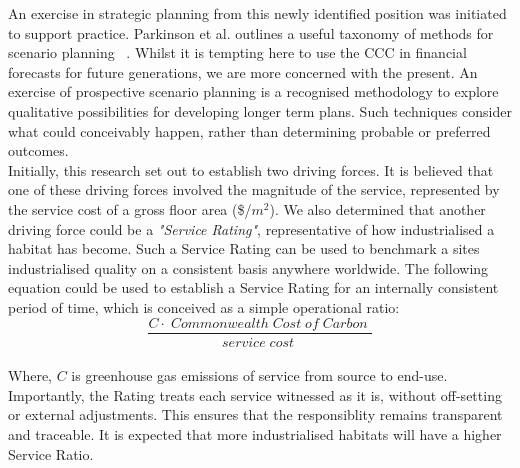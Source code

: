 \documentclass[10pt, oneside]{article}   	%
\begin{document}
An exercise in strategic planning from this newly identified position was initiated to support practice.
Parkinson et al. outlines a useful taxonomy of methods for scenario planning ~\cite{atp1}.
Whilst it is tempting here to use the CCC in financial forecasts for future generations, we are more concerned with the present.
An exercise of prospective scenario planning is a recognised methodology to explore qualitative possibilities for developing longer term plans.
Such techniques consider what could conceivably happen, rather than determining probable or preferred outcomes.\\

Initially, this research set out to establish two driving forces.
It is believed that one of these driving forces involved the magnitude of the service, represented by the service cost of a gross floor area (\$/$m^2$).
We also determined that another driving force could be a \emph{"Service Rating"}, representative of how industrialised a habitat has become.
Such a Service Rating can be used to benchmark a sites industrialised quality on a consistent basis anywhere worldwide.
The following equation could be used to establish a Service Rating for an internally consistent period of time, which is conceived as a simple operational ratio:\\

\begin{equation}
	\frac{C  \cdot \;Commonwealth\; Cost\; of\; Carbon\;}{service\; cost\;}
\end{equation}\\

Where, $C$ is greenhouse gas emissions of service from source to end-use.
Importantly, the Rating treats each service witnessed as it is, without off-setting or external adjustments.
This ensures that the responsiblity remains transparent and traceable.
It is expected that more industrialised habitats will have a higher Service Ratio.\\
\end{document}
